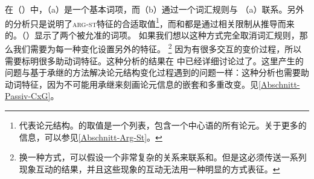 \eal
\ex {}
\ex {}
\zl
在（）中，（a）是一个基本词项，而（b）通过一个词汇规则与 （a）联系。另外的分析只是说明了\textsc{arg-st}特征的合适取值\footnote{%
\argstc 代表论元结构。\argstc 的取值是一个列表，包含一个中心语的所有论元。关于\argstc 更多的信息，可以参见\ref{Abschnitt-Arg-St}。
}，而\subcatc 和\slashvc 都是通过相关限制从\argstvc 推导而来的。（）显示了两个被允准的词项。
\eal
\ex {}
\ex {}
\zl
如果我们想以这种方式完全取消词汇规则，那么我们需要为每一种变化设置另外的特征。 \footnote{%
换一种方式，可以假设一个非常复杂的关系来联系\argstc 和\subcatc。但是这必须传送一系列现象互动的结果，并且这些现象的互动无法用一种明显的方式表征。%
} 因为有很多交互的变价过程，所以需要标明很多助动词特征。这种分析的结果在 中已经详细讨论过了。这里产生的问题与基于承继的方法解决论元结构变化过程遇到的问题一样：这种分析也需要助动词特征，因为不可能用承继来刻画论元信息的嵌套和多重改变。见\ref{Abschnitt-Passiv-CxG}。

